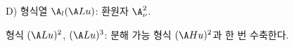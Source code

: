 
D) 형식열 $\A_l(\A Lu)$: 환원자 $\A_\nu^2$.

형식 $(\A Lu)^2$, $(\A Lu)^3$: 분해 가능 형식 $(\A Hu)^2$과 한 번 수축한다.

